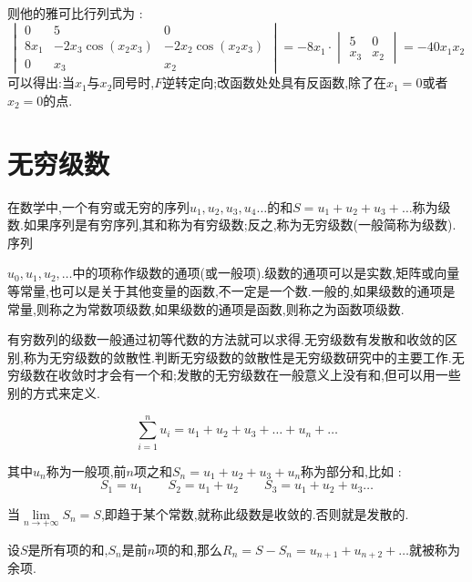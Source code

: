 \documentclass[UTF8,12pt]{ctexbook}
\newcommand{\limNormal}[1]{\lim\limits_{#1}}
\newcommand{\upDownSum}[2]{\sum\limits_{#2}^{#1}}
\begin{document}
{{{{\begin{enumerate}
{              则他的雅可比行列式为 :
              $$
                \begin{vmatrix}
                  0    & 5                 & 0                 \\
                  8x_1 & -2x_3\cos(x_2x_3) & -2x_2\cos(x_2x_3) \\
                  0    & x_3               & x_2
                \end{vmatrix}
                =
                -8x_1
                \cdot
                \begin{vmatrix}
                  5   & 0   \\
                  x_3 & x_2
                \end{vmatrix}
                =
                -40x_1x_2
              $$
              可以得出:当$x_1$与$x_2$同号时,$F$逆转定向;改函数处处具有反函数,除了在$x_1 = 0$或者$x_2 = 0$的点.
              }
      \end{enumerate}
    }%

  }%

}%

\section{无穷级数}{
在数学中,一个有穷或无穷的序列$u_{1},u_{2},u_{3},u_{4}\ldots$的和$S=u_{1}+u_{2}+u_{3}+\ldots$称为级数.如果序列是有穷序列,其和称为有穷级数;反之,称为无穷级数(一般简称为级数).序列{$u_{0},u_{1},u_{2},\ldots$中的项称作级数的通项(或一般项).级数的通项可以是实数,矩阵或向量等常量,也可以是关于其他变量的函数,不一定是一个数.一般的,如果级数的通项是常量,则称之为常数项级数,如果级数的通项是函数,则称之为函数项级数.

有穷数列的级数一般通过初等代数的方法就可以求得.无穷级数有发散和收敛的区别,称为无穷级数的敛散性.判断无穷级数的敛散性是无穷级数研究中的主要工作.无穷级数在收敛时才会有一个和;发散的无穷级数在一般意义上没有和,但可以用一些别的方式来定义.

$$
  \upDownSum{n}{i = 1}u_i = u_1 + u_2 + u_3 + \dots + u_n +  \dots
$$

其中$u_n$称为一般项,前$n$项之和$S_n = u_1 + u_2 + u_3 + u_n$称为部分和,比如 :
$$
  S_1 = u_1\qquad S_2 = u_1 + u_2\qquad S_3 = u_1 + u_2 + u_3 \dots
$$

当$\limNormal{n \to +\infty}S_n = S$,即趋于某个常数,就称此级数是收敛的.否则就是发散的.

设$S$是所有项的和,$S_n$是前$n$项的和,那么$R_n = S - S_n = u_{n+1} + u_{n + 2} + \dots$就被称为余项.

}}}
\end{document}
